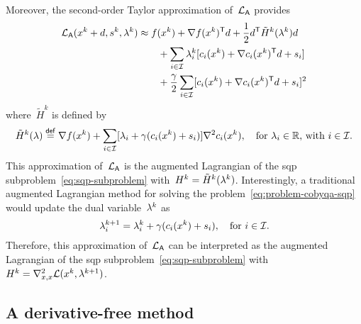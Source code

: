 Moreover, the second-order Taylor approximation of~$\lag[\mathsf{A}]$ provides
\begin{align*}
    \lag[\mathsf{A}](\iter[k] + d, s^k, \lm[k]) & \approx \obj(\iter[k]) + \nabla \obj(\iter[k])^{\T} d + \frac{1}{2} d^{\T} \tilde{H}^k(\lm[k]) d\\
                                                & \qquad + \sum_{i \in \iub} \lm[k]_i [\con{i}(\iter[k]) + \nabla \con{i}(\iter[k])^{\T} d + s_i]\\
                                                & \qquad + \frac{\gamma}{2} \sum_{i \in \iub} [\con{i}(\iter[k]) + \nabla \con{i}(\iter[k])^{\T} d + s_i]^2\\
\end{align*}
where~$\tilde{H}^k$ is defined by
\begin{equation*}
    \tilde{H}^k(\lm) \eqdef \nabla \obj(\iter[k]) + \sum_{i \in \iub} [\lm_i + \gamma (\con{i}(\iter[k]) + s_i)] \nabla^2 \con{i}(\iter[k]), \quad \text{for~$\lm_i \in \R$, with~$i \in \iub$.}
\end{equation*}
This approximation of~$\lag[\mathsf{A}]$ is the augmented Lagrangian of the \gls{sqp} subproblem~\cref{eq:sqp-subproblem} with~$H^k = \tilde{H}^k(\lm[k])$.
Interestingly, a traditional augmented Lagrangian method for solving the problem~\cref{eq:problem-cobyqa-sqp} would update the dual variable~$\lm[k]$ as
\begin{equation*}
    \lm_i^{k + 1} = \lm[k]_i + \gamma (\con{i}(\iter[k]) + s_i), \quad \text{for~$i \in \iub$}.
\end{equation*}
Therefore, this approximation of~$\lag[\mathsf{A}]$ can be interpreted as the augmented Lagrangian of the \gls{sqp} subproblem~\cref{eq:sqp-subproblem} with~$H^k = \nabla_{x, x}^2 \lag(\iter[k], \lm[k + 1])$.

\subsection{A derivative-free  method}
\label{subsec:derivative-free-sqp}

